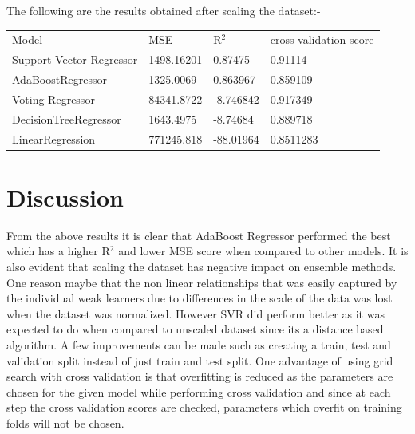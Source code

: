 \documentclass{article}
\begin{document}
The following are the results obtained after scaling the dataset:-\\
\begin{tabular}{llll}
Model                    & MSE        & R$^2$        & cross validation score \\
Support Vector Regressor & 1498.16201 & 0.87475   & 0.91114                \\
AdaBoostRegressor        & 1325.0069  & 0.863967  & 0.859109               \\
Voting Regressor         & 84341.8722 & -8.746842 & 0.917349               \\
DecisionTreeRegressor    & 1643.4975  & -8.74684  & 0.889718               \\
LinearRegression         & 771245.818 & -88.01964 & 0.8511283             
\end{tabular}


\section{Discussion}


From the above results it is clear that AdaBoost Regressor performed the best which has a higher R$^2$ and lower MSE score when compared to other models. It is also evident that scaling the dataset has negative impact on ensemble methods.
One reason maybe that the non linear relationships that was easily captured by the individual weak learners due to differences in the scale of the data was lost when the dataset was normalized. However SVR did perform better as it was expected to do when compared to unscaled dataset since its a distance based algorithm. A few improvements can be made such as creating a train, test and validation split instead of just train and test split. 
One advantage of using grid search with cross validation is that overfitting is reduced as the parameters are chosen for the given model while performing cross validation \cite{rodriguez2009sensitivity} and since at each step the cross validation scores are checked, parameters which overfit on training folds will not be chosen.
\end{document}
